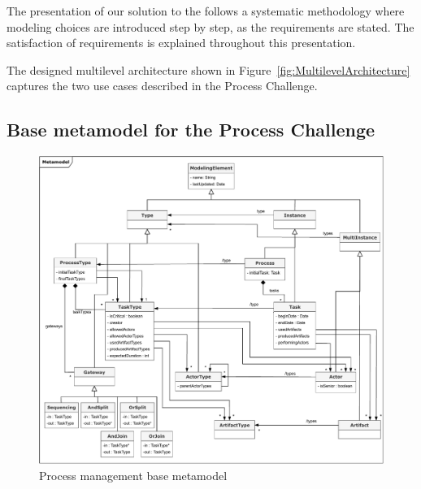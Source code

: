 
The presentation of our solution to the \mlpc follows a systematic methodology where modeling choices are introduced step by step, as the requirements are stated. The satisfaction of requirements is explained throughout this presentation.


The designed multilevel architecture shown in Figure~\ref{fig:MultilevelArchitecture} captures the two use cases described in the Process Challenge.


\subsection{Base metamodel for the Process Challenge}

\begin{figure}
 \centering
    \includegraphics[width=1.0 \textwidth]{Figures/Metamodel.pdf}
     \caption{Process management base metamodel}
    \label{fig:BaseMetamodel}
\end{figure}

